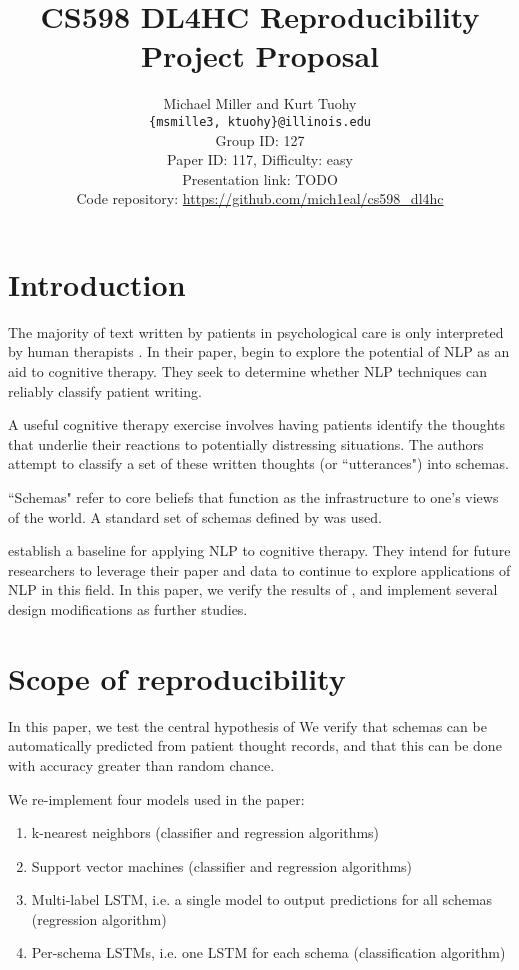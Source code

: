 \documentclass[11pt,a4paper]{article}
\title{CS598 DL4HC Reproducibility Project Proposal}
\author{Michael Miller and Kurt Tuohy\\
  \texttt{\{msmille3, ktuohy\}@illinois.edu}
  \\[2em]
  Group ID: 127\\
  Paper ID: 117, Difficulty: easy\\
  Presentation link: TODO\url{} \\
  Code repository: \url{https://github.com/mich1eal/cs598_dl4hc}}
\begin{document}
\maketitle


\section{Introduction}

The majority of text written by patients in psychological care is only interpreted by human therapists \citep{burger_2021}. In their paper, \citeauthor{burger_2021} begin to explore the potential of NLP as an aid to cognitive therapy. They seek to determine whether NLP techniques can reliably classify patient writing.

A useful cognitive therapy exercise involves having patients identify the thoughts that underlie their reactions to potentially distressing situations. The authors attempt to classify a set of these written thoughts (or ``utterances") into schemas.

``Schemas" refer to core beliefs that function as the infrastructure to one's views of the world. A standard set of schemas defined by \citeauthor{millings_2015} was used.

\citeauthor{burger_2021} establish a baseline for applying NLP to cognitive therapy. They intend for future researchers to leverage their paper and data to continue to explore applications of NLP in this field. In this paper, we verify the results of \citeauthor{burger_2021}, and implement several design modifications as further studies. 

\section{Scope of reproducibility}

In this paper, we test the central hypothesis of \citeauthor{burger_2021} We verify that schemas can be automatically predicted from patient thought records, and that this can be done with accuracy greater than random chance.

We re-implement four models used in the paper:
\begin{enumerate}
    \item k-nearest neighbors (classifier and regression algorithms)
    \item Support vector machines (classifier and regression algorithms)
    \item Multi-label LSTM, i.e. a single model to output predictions for all schemas (regression algorithm)
    \item Per-schema LSTMs, i.e. one LSTM for each schema (classification algorithm)
\end{enumerate}
\end{document}
